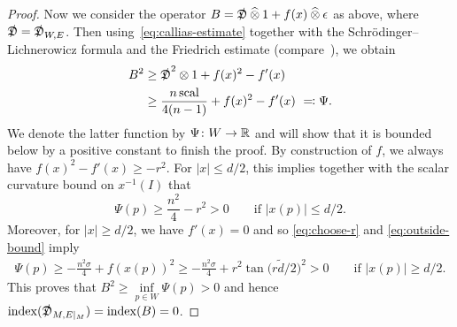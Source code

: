 \documentclass[11pt]{article}
\DeclareMathOperator{\scal}{scal}
\DeclareMathOperator{\ind}{index}
\numberwithin{equation}{section}
\begin{document}
\begin{proof}
 Now we consider the operator
 \(
 B = \slashed{\mathfrak{D}} \mathbin{\widehat{\otimes}} 1 + f(x) \mathbin{\widehat{\otimes}} \epsilon
 \)
 as above, where \(\slashed{\mathfrak{D}} = \slashed{\mathfrak{D}}_{W,E}\).
 Then \linebreak using~\eqref{eq:callias-estimate} together with the Schr\"odinger--Lichnerowicz formula and the Friedrich estimate (compare~\cite[Section~3.2]{Cecchini:LongNeck}), we obtain
 \begin{align*}
 B^2 &\geq \Dirac^2 \otimes 1 + f(x)^2 - f'(x) \\
 &\geq {\frac{n \scal}{4(n-1)} + f(x)^2 - f'(x)}\ \eqqcolon \Psi.
 \end{align*}
 We denote the latter function by \(\Psi \colon W \to \mathbb{R}\) and will show that it is bounded below by a positive constant to finish the proof.
 By construction of \(f\), we always have \(f(x)^2 - f'(x) \geq -r^2\).
 For \(|x| \leq d/2\), this implies together with the scalar curvature bound on \(x^{-1}(I)\) that
 \[
 \Psi(p) \geq \frac{n^2}{4} - r^2 > 0 \qquad \text{if \(|x(p)| \leq d/2\).}
 \]
 Moreover, for \(|x| \geq d/2\), we have \(f'(x) = 0\) and so \eqref{eq:choose-r} and \eqref{eq:outside-bound} imply
 \begin{align*}
\Psi(p) \geq - \frac{n^2 \sigma}{4} + f(x(p))^2 \geq - \frac{n^2 \sigma}{4} + r^2 \tan\big(r \tilde{d} / 2\big)^2 > 0 \qquad \text{if \(|x(p)| \geq d/2\).}
 \end{align*}
 This proves that \(B^2 \geq \inf\limits_{p \in W} \Psi(p) > 0\) and hence \(\ind(\Dirac_{M, E|_M}) = \ind(B) = 0\).
 \end{proof}
\end{document}

